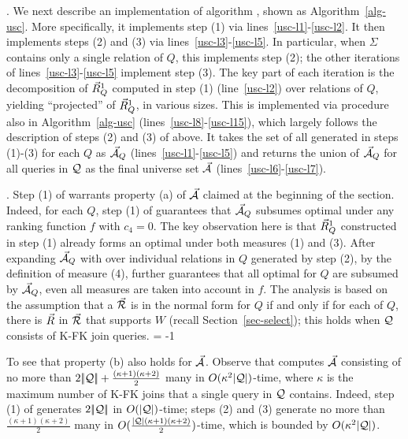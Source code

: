 {.
We next describe an implementation of algorithm \usc, shown as
Algorithm~\ref{alg-usc}. More specifically, it implements step
(1) via lines~\ref{usc-l1}-\ref{usc-l2}.
It then implements steps (2) and (3) via 
lines~\ref{usc-l3}-\ref{usc-l5}. In particular, when $\Sigma$
contains only a single relation of $Q$, this implements step (2);
the other iterations of lines~\ref{usc-l3}-\ref{usc-l5} implement
step (3). The key part of each iteration is the decomposition of
$\vec{R}_{Q}^{1}$ computed in step (1) (line~\ref{usc-l2}) over
relations of $Q$, yielding ``projected'' \bss of
$\vec{R}_{Q}^{1}$, in various sizes. This is implemented via
procedure \decompose also in Algorithm~\ref{alg-usc} (lines~\ref{usc-l8}-\ref{usc-l15}), which
largely follows the description of steps (2) and (3) of above.
It takes the set of all \bss generated in steps (1)-(3) for
each $Q$ as $\vec{{\mathcal A}}_{Q}$ (lines~\ref{usc-l1}-\ref{usc-l5}) and
returns the union of $\vec{{\mathcal A}}_{Q}$ for all queries in $\mathcal Q$ as the
final universe set $\vec{{\mathcal A}}$ (lines~\ref{usc-l6}-\ref{usc-l7}).

\begin{example}\label{exa-usc}
\end{example}




.
Step (1) of \usc warrants property (a) of $\vec{{\mathcal A}}$ claimed at
the beginning of the section. Indeed, for each $Q$, step (1) of
\usc guarantees that $\vec{{\mathcal A}}_{Q}$ subsumes optimal \bdss under
any ranking function $f$ with $c_{4} = 0$. The key observation
here is that $\vec{R}_{Q}^{1}$ constructed in step (1) already forms an
optimal \bds under both measures (1) and (3).
After expanding $\vec{{\mathcal A}}_{Q}$ with \bss over individual relations
in $Q$ generated by step (2), by the definition of measure (4),
\usc further guarantees that all optimal \bdss for $Q$ are subsumed by
$\vec{{\mathcal A}}_{Q}$, even all measures are taken into account in $f$.
The analysis is based on the assumption that a \bds $\vec{{\mathcal R}}$ is
in the normal form for $Q$ if and only if for each \qcs of $Q$, there
is \bs $\vec{R}$ in $\vec{{\mathcal R}}$ that supports $W$ (recall
Section~\ref{sec-select}); this holds when $\mathcal Q$
consists of K-FK join \SPC queries.
\looseness = -1

To see that property (b) also holds
for $\vec{{\mathcal A}}$. Observe that \usc computes $\vec{{\mathcal A}}$ consisting of
no more than $2|\!|{\mathcal Q}|\!| + \frac{(\kappa+1)(\kappa+2)}{2}$
many \bss in $O(\kappa^{2}|{\mathcal Q}|)$-time, where $\kappa$ is the
maximum number of K-FK joins that a single query in $\mathcal Q$
contains. Indeed, step (1) of \usc generates $2|\!|{\mathcal Q}|\!|$ \bss in
$O(|{\mathcal Q}|)$-time; steps (2) and (3) generate no more than
$\frac{(\kappa+1)(\kappa+2)}{2}$ many \bss in
$O(\frac{|{\mathcal Q}|(\kappa+1)(\kappa+2)}{2})$-time, which is bounded
by $O(\kappa^{2}|{\mathcal Q}|)$.


}
